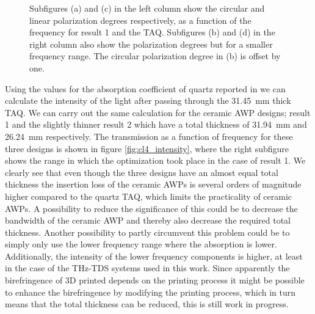 \begin{figure}[H]
\centering
\subcaptionbox{\label{fig:cl4_pol_deg_a}}
    {\hspace*{-2em}}
\qquad
\subcaptionbox{\label{fig:cl4_pol_deg_b}}
    {\hspace*{-2em}}

\subcaptionbox{\label{fig:cl4_pol_deg_c}}
    {\hspace*{-2em}}
\qquad
\subcaptionbox{\label{fig:cl4_pol_deg_d}}
    {\hspace*{-2em}}
\caption{Subfigures (a) and (c) in the left column show the circular and linear polarization degrees respectively, as a function of the frequency for result 1 and the TAQ. Subfigures (b) and (d) in the right column also show the polarization degrees but for a smaller frequency range. The circular polarization degree in (b) is offset by one.}
\label{fig:cl4_pol_deg}
\end{figure}

Using the values for the absorption coefficient of quartz reported in \cite{DGrischkowsky1990} we can calculate the intensity of the light after passing through the \SI{31.45}{\milli \meter} thick TAQ. We can carry out the same calculation for the ceramic AWP designs; result 1 and the slightly thinner result 2 which have a total thickness of \SI{31.94}{\milli \meter} and \SI{26.24}{\milli \meter} respectively. The transmission as a function of frequency for these three designs is shown in figure \ref{fig:cl4_intensity}, where the right subfigure shows the range in which the optimization took place in the case of result 1. We clearly see that even though the three designs have an almost equal total thickness the insertion loss of the ceramic AWPs is several orders of magnitude higher compared to the quartz TAQ, which limits the practicality of ceramic AWPs.
A possibility to reduce the significance of this could be to decrease the bandwidth of the ceramic AWP and thereby also decrease the required total thickness. Another possibility to partly circumvent this problem could be to simply only use the lower frequency range where the absorption is lower. Additionally, the intensity of the lower frequency components is higher, at least in the case of the THz-TDS systems used in this work. Since apparently the birefringence of 3D printed  depends on the printing process it might be possible to enhance the birefringence by modifying the printing process, which in turn means that the total thickness can be reduced, this is still work in progress.

